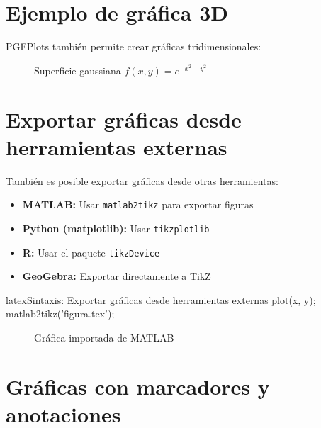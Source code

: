 \section{Ejemplo de gráfica 3D}
\label{sec:grafica-3d}

PGFPlots también permite crear gráficas tridimensionales:

\begin{figure}[H]
  \centering
  \caption{Superficie gaussiana $f(x,y) = e^{-x^2-y^2}$}
  \label{fig:3d}
\end{figure}

\section{Exportar gráficas desde herramientas externas}
\label{sec:exportar-graficas}

También es posible exportar gráficas desde otras herramientas:

\begin{itemize}
  \item \textbf{MATLAB:} Usar \texttt{matlab2tikz} para exportar figuras
  \item \textbf{Python (matplotlib):} Usar \texttt{tikzplotlib}
  \item \textbf{R:} Usar el paquete \texttt{tikzDevice}
  \item \textbf{GeoGebra:} Exportar directamente a TikZ
\end{itemize}

\begin{codigosimple}{latex}{Sintaxis: Exportar gráficas desde herramientas externas}
plot(x, y);
matlab2tikz('figura.tex');

\begin{figure}[H]
  \centering
  
  \caption{Gráfica importada de MATLAB}
\end{figure}
\end{codigosimple}

\section{Gráficas con marcadores y anotaciones}
\label{sec:graficas-marcadores}


